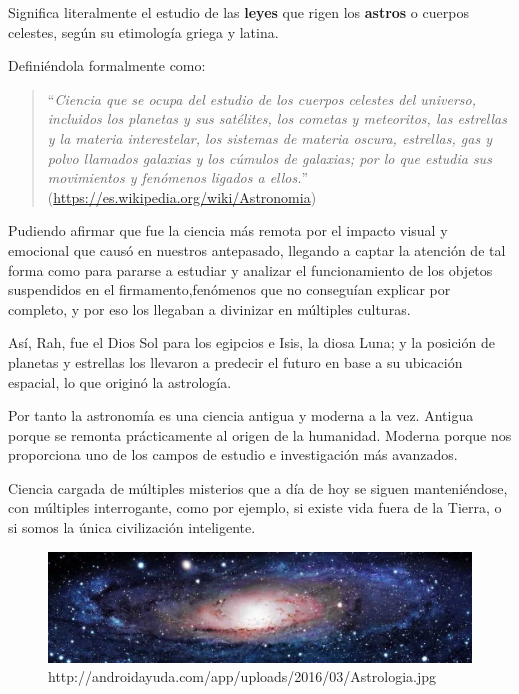\bigskip
Significa literalmente el estudio de las \textbf{leyes} que rigen los \textbf{astros} o cuerpos celestes, según su etimología griega y latina.

\bigskip
Definiéndola formalmente como:

\begin{quote}``\textit{Ciencia que se ocupa del estudio de los cuerpos celestes del universo, incluidos los planetas y sus satélites, los cometas y meteoritos, las estrellas y la materia interestelar,
  los sistemas de materia oscura, estrellas, gas y polvo llamados galaxias y los cúmulos de galaxias; por lo que estudia sus movimientos y fenómenos ligados a ellos.}''
\newline(\href{https://es.wikipedia.org/wiki/Astronom%C3%ADa}{https://es.wikipedia.org/wiki/Astronomia})
\end{quote}

\bigskip
Pudiendo afirmar que fue la ciencia más remota por el impacto visual y emocional que causó en nuestros antepasado, llegando a captar la atención de tal forma como para pararse a estudiar y analizar el funcionamiento de los objetos suspendidos en el firmamento,fenómenos que no conseguían explicar por completo, y por eso los llegaban a divinizar en múltiples culturas.

\bigskip
Así, Rah, fue el Dios Sol para los egipcios e Isis, la diosa Luna;
y la posición de planetas y estrellas los llevaron a predecir el futuro en base a su ubicación espacial, lo que originó la astrología.

\bigskip
Por tanto la  astronomía es una ciencia antigua y moderna a la vez. \newline
Antigua porque se remonta prácticamente al origen de la humanidad.\newline
Moderna porque nos proporciona uno de los campos de estudio e investigación más avanzados.

\bigskip
Ciencia cargada de múltiples misterios que a día de hoy se siguen manteniéndose, con múltiples  interrogante, como por ejemplo,  si existe vida fuera de la Tierra, o si somos la única civilización
inteligente.


\begin{figure}[b]
\centering
\includegraphics[width=0.9\linewidth]{../images/astrofooter}
\caption[Galaxia]{http://androidayuda.com/app/uploads/2016/03/Astrologia.jpg}
\label{fig:astrofooter}
\end{figure}


